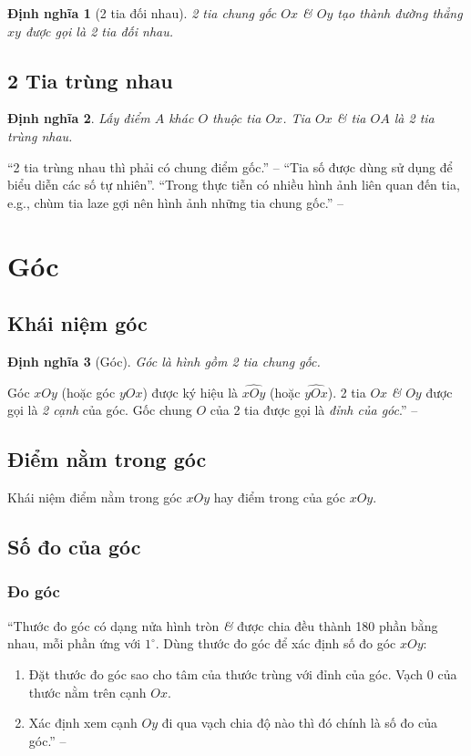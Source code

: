\documentclass[oneside]{book}
\numberwithin{equation}{section}
\newtheorem{dinhnghia}{Định nghĩa}[section]
\begin{document}
\begin{dinhnghia}[2 tia đối nhau]
	2 tia chung gốc $Ox$ \textit{\&} $Oy$ tạo thành đường thẳng $xy$ được gọi là \emph{2 tia đối nhau}.
\end{dinhnghia}

\subsection{2 Tia trùng nhau}

\begin{dinhnghia}
	Lấy điểm $A$ khác $O$ thuộc tia $Ox$. Tia $Ox$ \textit{\&} tia $OA$ là \emph{2 tia trùng nhau}.
\end{dinhnghia}
``2 tia trùng nhau thì phải có chung điểm gốc.'' -- \cite[p. 91]{Thai_Anh_Dat_Ha_Loan_Nam_Quang_Toan_6_tap_2} ``Tia số được dùng sử dụng để biểu diễn các số tự nhiên''. ``Trong thực tiễn có nhiều hình ảnh liên quan đến tia, e.g., chùm tia laze gợi nên hình ảnh những tia chung gốc.'' -- \cite[p. 93]{Thai_Anh_Dat_Ha_Loan_Nam_Quang_Toan_6_tap_2}

\section{Góc}

\subsection{Khái niệm góc}

\begin{dinhnghia}[Góc]
	\emph{Góc} là hình gồm 2 tia chung gốc.
\end{dinhnghia}
Góc $xOy$  (hoặc góc $yOx$) được ký hiệu là $\widehat{xOy}$ (hoặc $\widehat{yOx}$). 2 tia $Ox$ \textit{\&} $Oy$ được gọi là \textit{2 cạnh} của góc. Gốc chung $O$ của 2 tia được gọi là \textit{đỉnh của góc}.'' -- \cite[p. 94]{Thai_Anh_Dat_Ha_Loan_Nam_Quang_Toan_6_tap_2}

\subsection{Điểm nằm trong góc}
Khái niệm điểm nằm trong góc $xOy$ hay điểm trong của góc $xOy$.

\subsection{Số đo của góc}

\subsubsection{Đo góc}
``Thước đo góc có dạng nửa hình tròn \textit{\&} được chia đều thành 180 phần bằng nhau, mỗi phần ứng với $1^\circ$. Dùng thước đo góc để xác định số đo góc $xOy$:
\begin{enumerate}
	\item Đặt thước đo góc sao cho tâm của thước trùng với đỉnh của góc. Vạch 0 của thước nằm trên cạnh $Ox$.
	\item Xác định xem cạnh $Oy$ đi qua vạch chia độ nào thì đó chính là số đo của góc.'' -- \cite[p. 96]{Thai_Anh_Dat_Ha_Loan_Nam_Quang_Toan_6_tap_2}
\end{enumerate}
\end{document}
